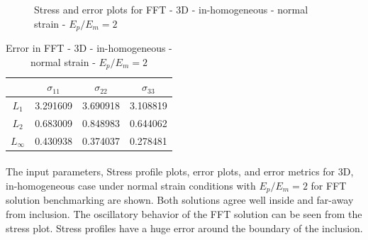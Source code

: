 \documentclass[12pt, a4paper]{report}
\begin{document}
\begin{figure}[htbp]
  \centering
  \hfill
  \caption{Stress and error plots for FFT - 3D - in-homogeneous - normal strain - $E_p/E_m = 2$}
\end{figure}

\begin{table}[H]
    \centering
    \begin{tabular}{|c|c|c|c|}
        \hline
        &\textbf{$\sigma_{11}$} &  \textbf{$\sigma_{22}$} & \textbf{$\sigma_{33}$}\\
        \hline
        $L_1$ & 3.291609 & 3.690918 & 3.108819 \\
        \hline
        $L_2$ & 0.683009 & 0.848983 & 0.644062 \\
        \hline 
        $L_\infty$ & 0.430938 & 0.374037 & 0.278481 \\
        \hline
    \end{tabular}
    \caption{Error in FFT - 3D - in-homogeneous - normal strain - $E_p/E_m = 2$}
\end{table}

\paragraph{}
The input parameters, Stress profile plots, error plots, and error metrics for 3D, in-homogeneous case under normal strain conditions with $E_p / E_m = 2$ for FFT solution benchmarking are shown. Both solutions agree well inside and far-away from inclusion. The oscillatory behavior of the FFT solution can be seen from the stress plot. Stress profiles have a huge error around the boundary of the inclusion.
\end{document}

